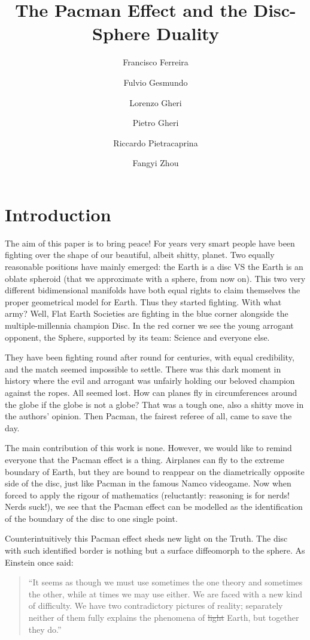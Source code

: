 \documentclass{article}
\title{The Pacman Effect and the Disc-Sphere Duality}
\author{Francisco Ferreira
\and Fulvio Gesmundo \and Lorenzo Gheri \and Pietro Gheri \and  Riccardo Pietracaprina \and Fangyi Zhou }
\date{}
\begin{document}
\maketitle

\section{Introduction}

The aim of this paper is to bring peace! For years very smart people have been
fighting over the shape of our beautiful, albeit shitty, planet. Two equally
reasonable positions have mainly emerged: the Earth is a disc VS the Earth is an oblate spheroid
(that we approximate with a sphere, from now on). This two very different bidimensional manifolds have both equal rights
to claim themselves the proper geometrical model for Earth. Thus they started
fighting. With what army? Well, Flat Earth Societies are fighting in the blue
corner alongside the multiple-millennia champion Disc. In the red corner we see
the young arrogant opponent, the Sphere, supported by its team: Science and
everyone else.

They have been fighting round after round for centuries, with equal
credibility, and the match seemed impossible to settle. There was this dark
moment in history where the evil and arrogant was unfairly holding our beloved
champion against the ropes. All seemed lost. How can planes fly in
circumferences around the globe if the globe is not a globe? That was a tough
one, also a shitty move in the authors' opinion. Then Pacman, the fairest
referee of all, came to save the day.

The main contribution of this work is none. However, we would like to remind
everyone that the Pacman effect is a thing. Airplanes can fly to the extreme
boundary of Earth, but they are bound to reappear on the diametrically opposite
side of the disc, just like Pacman in the famous Namco videogame. Now when
forced to apply the rigour of mathematics (reluctantly: reasoning is for nerds!
Nerds suck!), we see that the Pacman effect can be modelled as the
identification of the boundary of the disc to one single point.

Counterintuitively this Pacman effect sheds new light on the Truth. The disc
with such identified border is nothing but a surface diffeomorph to the sphere.
As Einstein once said:

\begin{quote}
``It seems as though we must use sometimes the one theory and sometimes the
other, while at times we may use either. We are faced with a new kind of
difficulty. We have two contradictory pictures of reality; separately neither
of them fully explains the phenomena of \sout{light} Earth, but together they do.''
\end{quote}
\end{document}
